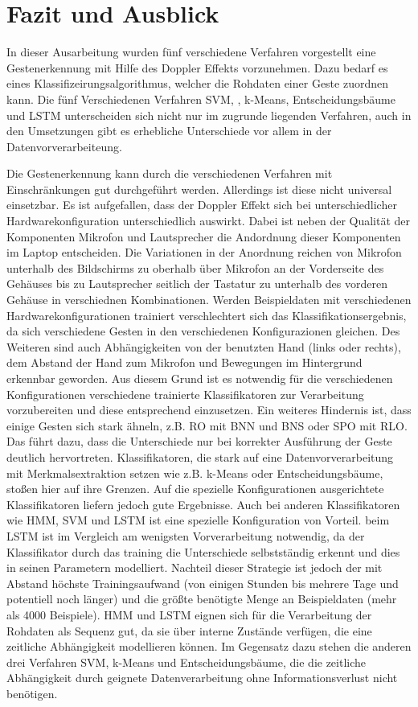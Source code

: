 \section{Fazit und Ausblick} 

In dieser Ausarbeitung wurden fünf verschiedene Verfahren vorgestellt eine
Gestenerkennung mit Hilfe des Doppler Effekts vorzunehmen. Dazu bedarf es eines
Klassifizeirungsalgorithmus, welcher die Rohdaten einer Geste zuordnen kann. Die
fünf Verschiedenen Verfahren \ac{SVM}, , k-Means, Entscheidungsbäume und
\ac{LSTM} unterscheiden sich nicht nur im zugrunde liegenden Verfahren, auch in
den Umsetzungen gibt es erhebliche Unterschiede vor allem in der
Datenvorverarbeiteung. 

Die Gestenerkennung kann durch die verschiedenen Verfahren mit Einschränkungen
gut durchgeführt werden. Allerdings ist diese nicht universal einsetzbar. Es ist
aufgefallen, dass der Doppler Effekt sich bei unterschiedlicher
Hardwarekonfiguration unterschiedlich auswirkt. Dabei ist neben der Qualität der
Komponenten Mikrofon und Lautsprecher die Andordnung dieser Komponenten im
Laptop entscheiden. Die Variationen in der Anordnung reichen von Mikrofon
unterhalb des Bildschirms zu oberhalb über Mikrofon an der Vorderseite des
Gehäuses bis zu Lautsprecher seitlich der Tastatur zu unterhalb des vorderen
Gehäuse in verschiednen Kombinationen. Werden Beispieldaten mit verschiedenen
Hardwarekonfigurationen trainiert verschlechtert sich das
Klassifikationsergebnis, da sich verschiedene Gesten in den verschiedenen
Konfigurazionen gleichen. Des Weiteren sind auch Abhängigkeiten von der
benutzten Hand (links oder rechts), dem Abstand der Hand zum Mikrofon und
Bewegungen im Hintergrund erkennbar geworden. Aus diesem Grund ist es notwendig
für die verschiedenen Konfigurationen verschiedene trainierte Klassifikatoren
zur Verarbeitung vorzubereiten und diese entsprechend einzusetzen. Ein weiteres
Hindernis ist, dass einige Gesten sich stark ähneln, z.B. \ac{RO} mit \ac{BNN}
und \ac{BNS} oder \ac{SPO} mit \ac{RLO}. Das führt dazu, dass die Unterschiede
nur bei korrekter Ausführung der Geste deutlich hervortreten.
Klassifikatoren, die stark auf eine Datenvorverarbeitung mit Merkmalsextraktion
setzen wie z.B. k-Means oder Entscheidungsbäume, stoßen hier auf ihre Grenzen.
Auf die spezielle Konfigurationen ausgerichtete Klassifikatoren liefern jedoch
gute Ergebnisse. Auch bei anderen Klassifikatoren wie \ac{HMM}, \ac{SVM} und
\ac{LSTM} ist eine spezielle Konfiguration von Vorteil. beim \ac{LSTM} ist im
Vergleich am wenigsten Vorverarbeitung notwendig, da der Klassifikator durch das
training die Unterschiede selbstständig erkennt und dies in seinen Parametern
modelliert. Nachteil dieser Strategie ist jedoch der mit Abstand höchste
Trainingsaufwand (von einigen Stunden bis mehrere Tage und potentiell noch
länger) und die größte benötigte Menge an Beispieldaten (mehr als 4000
Beispiele). \ac{HMM} und \ac{LSTM} eignen sich für die Verarbeitung der Rohdaten
als Sequenz gut, da sie über interne Zustände verfügen, die eine zeitliche
Abhängigkeit modellieren können. Im Gegensatz dazu stehen die anderen drei
Verfahren \ac{SVM}, k-Means und Entscheidungsbäume, die die zeitliche
Abhängigkeit durch geignete Datenverarbeitung ohne Informationsverlust nicht
benötigen.

